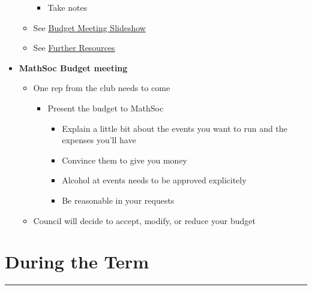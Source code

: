 \documentclass[utf8]{article}
\newcommand{\budgetSlideshow}{\href{https://docs.google.com/presentation/d/1STBZmvycCzdxlngaaHDIre7LndTr-057gBXYInwFuVg/edit?usp=sharing}{\underline{Budget Meeting Slideshow} }}
\renewcommand{\labelitemi}{$\square$}
\renewcommand\labelitemii{\textbullet}
\renewcommand\labelitemiii{$\square$}
\newcommand{\otherresources}{\hyperref[sec:otherresources]{\underline{Further Resources}}}
\begin{document}
\begin{itemize}
\begin{itemize}
\begin{itemize}
            \item Take notes
        \end{itemize}
        \item See \budgetSlideshow
        \item See \otherresources
    \end{itemize}
    \item \textbf{MathSoc Budget meeting}
    \begin{itemize}
        \item One rep from the club needs to come
        \begin{itemize}
            \item Present the budget to MathSoc
            \begin{itemize}
                \item Explain a little bit about the events you want to run and the expenses you’ll have
                \item Convince them to give you money
                \item Alcohol at events needs to be approved explicitely
                \item Be reasonable in your requests
            \end{itemize}
        \end{itemize}
        \item Council will decide to accept, modify, or reduce your budget
    \end{itemize}
\end{itemize}

\renewcommand{\labelitemi}{\textbullet}
\renewcommand\labelitemii{$\square$}
\renewcommand\labelitemiii{\textbullet}

\section*{During the Term}
\par\rule{\textwidth}{0.4pt}\\
\end{document}
